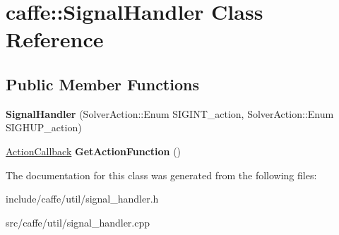 \hypertarget{classcaffe_1_1SignalHandler}{}\section{caffe\+:\+:Signal\+Handler Class Reference}
\label{classcaffe_1_1SignalHandler}
\subsection*{Public Member Functions}
\begin{DoxyCompactItemize}
\item 
{\bfseries Signal\+Handler} (Solver\+Action\+::\+Enum S\+I\+G\+I\+N\+T\+\_\+action, Solver\+Action\+::\+Enum S\+I\+G\+H\+U\+P\+\_\+action)\hypertarget{classcaffe_1_1SignalHandler_acbe6d04edd98cd7481653e82a2fcdf52}{}\label{classcaffe_1_1SignalHandler_acbe6d04edd98cd7481653e82a2fcdf52}

\item 
\hyperlink{namespacecaffe_a79ce9ffbdd44b367252e0b8cf99bf430}{Action\+Callback} {\bfseries Get\+Action\+Function} ()\hypertarget{classcaffe_1_1SignalHandler_a50b4b45b2e63b77b3c74f1e32e30f2d9}{}\label{classcaffe_1_1SignalHandler_a50b4b45b2e63b77b3c74f1e32e30f2d9}

\end{DoxyCompactItemize}


The documentation for this class was generated from the following files\+:\begin{DoxyCompactItemize}
\item 
include/caffe/util/signal\+\_\+handler.\+h\item 
src/caffe/util/signal\+\_\+handler.\+cpp\end{DoxyCompactItemize}
